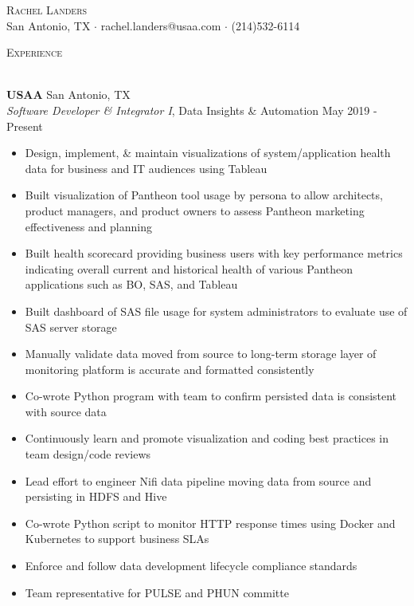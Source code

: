 \documentclass[a4paper]{article}
\newcommand{\lineunder} {
    \vspace*{-8pt} \\
    \hspace*{-18pt} \hrulefill \\
}
\newcommand{\header} [1] {
    {\hspace*{-18pt}\vspace*{6pt} \textsc{#1}}
    \vspace*{-6pt} \lineunder
}
\begin{document}
\vspace*{-10pt}

    

\vspace*{-40pt}
\begin{center}
	{\Huge \scshape {Rachel Landers}}\\
	San Antonio, TX $\cdot$ rachel.landers@usaa.com $\cdot$ (214)532-6114\\
\end{center}

\header{Experience}
\vspace{1mm}

\textbf{USAA} \hfill San Antonio, TX\\
\textit{Software Developer \& Integrator I}, Data Insights \& Automation \hfill May 2019 - Present\\
\vspace{-1mm}
\begin{itemize} \itemsep .5pt
        \item Design, implement, \& maintain visualizations of system/application health data for business and IT audiences using Tableau
	\item Built visualization of Pantheon tool usage by persona to allow architects, product managers, and product owners to assess Pantheon marketing effectiveness and planning
	\item Built health scorecard providing business users with key performance metrics indicating overall current and historical health of various Pantheon applications such as BO, SAS, and Tableau
	\item Built dashboard of SAS file usage for system administrators to evaluate use of SAS server storage
        \item Manually validate data moved from source to long-term storage layer of monitoring platform is accurate and formatted consistently
        \item Co-wrote Python program with team to confirm persisted data is consistent with source data
        \item Continuously learn and promote visualization and coding best practices in team design/code reviews
        \item Lead effort to engineer Nifi data pipeline moving data from source and persisting in HDFS and Hive
        \item Co-wrote Python script to monitor HTTP response times using Docker and Kubernetes to support business SLAs
        \item Enforce and follow data development lifecycle compliance standards
	\item Team representative for PULSE and PHUN committe
\end{itemize}
\end{document}
